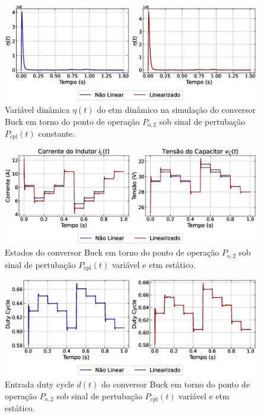 \begin{figure}[H]
  \centering
  \captionsetup{justification=centering}
  \includegraphics[width=1.\textwidth]{figuras/dynamic-etm/buck/sim2/op1/eta.eps}
  \caption{Variável dinâmica $\eta(t)$ do \acrshort{etm} dinâmico na simulação do conversor Buck em torno do ponto de operação $P_{\mathrm{o}, 2}$ sob sinal de pertubação $P_{\mathrm{cpl}}(t)$ constante.}
\end{figure}


\begin{figure}[H]
  \centering
  \captionsetup{justification=centering}
  \includegraphics[width=1.\textwidth]{figuras/dynamic-etm/buck/sim2/op2/result.eps}
  \caption{Estados do conversor Buck em torno do ponto de operação $P_{\mathrm{o}, 2}$ sob sinal de pertubação $P_{\mathrm{cpl}}(t)$ variável e \acrshort{etm} estático.}
\end{figure}

\begin{figure}[H]
  \centering
  \captionsetup{justification=centering}
  \includegraphics[width=1.\textwidth]{figuras/dynamic-etm/buck/sim2/op2/duty-cycle.eps}
  \caption{Entrada duty cycle $d(t)$ do conversor Buck em torno do ponto de operação $P_{\mathrm{o}, 2}$ sob sinal de pertubação $P_{\mathrm{cpl}}(t)$ variável e \acrshort{etm} estático.}
\end{figure}

